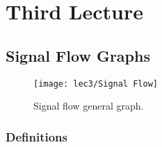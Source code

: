 \setchapterpreamble[u]{\margintoc}
\chapter{Third Lecture}


\section{Signal Flow Graphs}

\begin{figure}[h]
	\texttt{[image: lec3/Signal Flow]}
	\caption{Signal flow general graph.}
\end{figure}

\subsection{Definitions}

